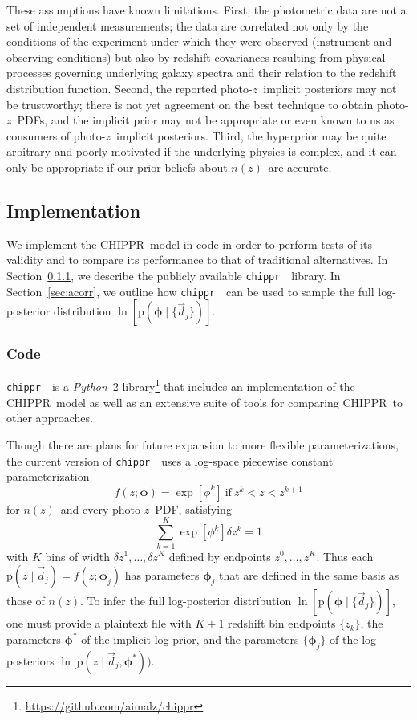\documentclass[iop]{emulateapj}
\newcommand{\todo}[3]{{\color{#2}\emph{#1}: #3}}
\newcommand{\aim}[1]{\todo{AIM}{red}{#1}}
\newcommand{\Sect}[1]{Section~\ref{#1}}
\newcommand{\project}[1]{{\textsc{#1}}}
\newcommand{\Chippr}{\project{CHIPPR}}
\newcommand{\repo}[1]{{\texttt{#1}}~}
\newcommand{\chippr}{\repo{chippr}}
\newcommand{\python}{\textit{Python}}
\newcommand{\nz}{$n(z)$}
\newcommand{\data}{\ensuremath{\vec{d}}}
\newcommand{\pr}[1]{\ensuremath{\mathrm{p}(#1)}}
\newcommand{\gvn}{\mid}%
\newcommand{\pz}{photo-$z$~}
\newcommand{\pzpdf}{\pz PDF}
\newcommand{\pzip}{\pz implicit posterior}
\newcommand{\bvec}[1]{\ensuremath{\boldsymbol{#1}}}
\newcommand{\ndphi}{\bvec{\phi}}
\begin{document}
These assumptions have known limitations.  
First, the photometric data are not a set of independent measurements; the data are correlated not only by the conditions of the experiment under which they were observed (instrument and observing conditions) but also by redshift covariances resulting from physical processes governing underlying galaxy spectra and their relation to the redshift distribution function.
Second, the reported \pzip s may not be trustworthy; there is not yet agreement on the best technique to obtain \pzpdf s, and the implicit prior may not be appropriate or even known to us as consumers of \pzip s.  
Third, the hyperprior may be quite arbitrary and poorly motivated if the underlying physics is complex, and it can only be appropriate if our prior beliefs about \nz\ are accurate.

\subsection{Implementation}
\label{sec:exp}

We implement the \Chippr\ model in code in order to perform tests of its validity and to compare its performance to that of traditional alternatives.
In \Sect{sec:mcmc}, we describe the publicly available \chippr\ library.
In \Sect{sec:acorr}, we outline how \chippr\ can be used to sample the full log-posterior distribution $\ln[\pr{\ndphi \gvn \{\data_{j}\}}]$.

\subsubsection{Code}
\label{sec:mcmc}

\chippr\ is a \python\ 2 library\footnote{\url{https://github.com/aimalz/chippr}} that includes an implementation of the \Chippr\ model as well as an extensive suite of tools for comparing \Chippr\ to other approaches.

Though there are plans for future expansion to more flexible parameterizations, the current version of \chippr\ uses a log-space piecewise constant parameterization
\begin{equation}
\label{eqn:logstepfunc}
f(z; \ndphi) = \exp[\phi^{k}]\ \mathrm{if}\ z^{k} < z < z^{k+1}
\end{equation}
for \nz\ and every \pzpdf, satisfying
\begin{equation}
\label{eqn:logstepfuncnorm}
\sum_{k=1}^{K} \exp[\phi^{k}] \delta z^{k} = 1
\end{equation}
with $K$ bins of width $\delta z^{1}, \dots, \delta z^{K}$ defined by endpoints $z^{0}, \dots, z^{K}$.
Thus each $\pr{z \gvn \data_{j}} = f(z; \ndphi_{j})$ has parameters $\ndphi_{j}$ that are defined in the same basis as those of \nz.
To infer the full log-posterior distribution $\ln[\pr{\ndphi \gvn \{\data_{j}\}}]$, one must provide a plaintext file with $K+1$ redshift bin endpoints $\{z_{k}\}$, the parameters $\ndphi^{*}$ of the implicit log-prior, and the parameters $\{\ndphi_{j}\}$ of the log-posteriors $\ln[\pr{z \gvn \data_{j}, \ndphi^{*})}$.
\end{document}
